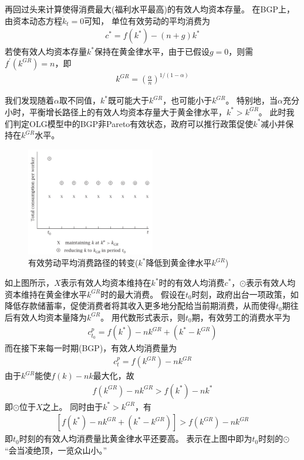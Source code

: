 \documentclass[cn,normal,11pt,black]{elegantnote}
\begin{document}
再回过头来计算使得消费最大(福利水平最高)的有效人均资本存量。
在BGP上，由资本动态方程$\dot{k}_t =0$可知，
单位有效劳动的平均消费为
\begin{align}
c^* = f(k^*) - (n+g) k^*
\end{align}
若使有效人均资本存量$k^*$保持在黄金律水平，由于已假设$g=0$，则需$f^\prime(k^{GR}) = n$，即
\begin{align}
k^{GR} = \left(\frac{\alpha}{n}\right)^{1/(1-\alpha)}
\end{align}

我们发现随着$\alpha$取不同值，$k^*$既可能大于$k^{GR}$，也可能小于$k^{GR}$。
特别地，当$\alpha$充分小时，平衡增长路径上的有效人均资本存量大于黄金律水平，$k^* > k^{GR}$。
此时我们判定OLG模型中的BGP非Pareto有效状态，政府可以推行政策促使$k^*$减小并保持在$k^{GR}$水平。

\begin{figure}[!htbp]
    \centering
    \includegraphics[width=0.5\textwidth]{image/olg1.png}
    \caption{有效劳动平均消费路径的转变($k^*$降低到黄金律水平$k^{GR}$)}     \label{olg1}
\end{figure}

如上图所示，$X$表示有效人均资本维持在$k^*$时的有效人均消费$c^*$，$\odot$表示有效人均资本维持在黄金律水平$k^{GR}$时的最大消费。
假设在$t_0$时刻，政府出台一项政策，如降低存款储蓄率，促使消费者将其收入更多地分配给当前期消费，从而使得$t_0$期往后有效人均资本量降为$k^{GR}$。
用代数形式表示，则$t_0$期，有效劳工的消费水平为
\begin{align}
c^p_{t_0} = f(k^*) - nk^{GR} + (k^* - k^{GR})
\end{align}
而在接下来每一时期(BGP)，有效人均消费量为
\begin{align}
c^p_{t} = f(k^{GR}) - n k^{GR}
\end{align}
由于$k^{GR}$能使$f(k) -nk$最大化，故
\begin{align}
f(k^{GR}) - nk^{GR} > f(k^{*}) - nk^{*}
\end{align}
即$\odot$位于$X$之上。
同时由于$k^* > k^{GR}$，有
\begin{align}
\left[ f(k^{*}) - nk^{GR} + (k^* - k^{GR}) \right]> f(k^{GR}) - nk^{GR}
\end{align}
即$t_0$时刻的有效人均消费量比黄金律水平还要高。
表示在上图中即为$t_0$时刻的$\odot$“会当凌绝顶，一览众山小。”
\end{document}
